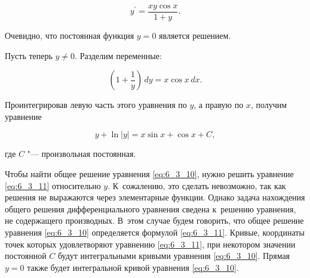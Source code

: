 \begin{equation}\label{eq:6_3_10}
y^\prime = \dfrac{xy \cos x}{1 + y}.
\end{equation}

Очевидно, что постоянная функция $y = 0$ является решением.

Пусть теперь $y \ne 0$. Разделим переменные:

\begin{equation*}
\left( 1 + \dfrac{1}{y} \right) \, dy = x \cos x \, dx.
\end{equation*}

\noindent
Проинтегрировав левую часть этого уравнения по $y$, а правую по $x$,
получим уравнение

\begin{equation}\label{eq:6_3_11}
y + \ln |y| = x \sin x + \cos x + C,
\end{equation}

\noindent
где $C$ "--- произвольная постоянная.

Чтобы найти общее решение уравнения \eqref{eq:6_3_10}, нужно решить уравнение
\eqref{eq:6_3_11} относительно $y$. К~сожалению, это сделать невозможно,
так как решения не выражаются через элементарные функции.
Однако задача нахождения общего решения дифференциального уравнения сведена
к~решению уравнения, не содержащего производных. В~этом случае будем говорить,
что общее решение уравнения \eqref{eq:6_3_10} определяется формулой \eqref{eq:6_3_11}.
Кривые, координаты точек которых удовлетворяют уравнению \eqref{eq:6_3_11},
при некотором значении постоянной $C$ будут интегральными кривыми уравнения
\eqref{eq:6_3_10}. Прямая $y = 0$ также будет интегральной кривой уравнения
\eqref{eq:6_3_10}.
